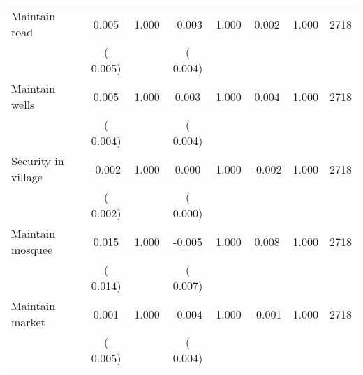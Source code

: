 \begin{tabular}{l*{7}{c}}
 Maintain road       &              0.005       &        1.000  &             -0.003       &        1.000  &              0.002       &              1.000 &  2718 \\ 
                       &       (       0.005)             &                               &       (       0.004)                     &                               &                                               &                                &                      \\ 

 Maintain wells       &              0.005       &        1.000  &              0.003       &        1.000  &              0.004       &              1.000 &  2718 \\ 
                       &       (       0.004)             &                               &       (       0.004)                     &                               &                                               &                                &                      \\ 

 Security in village       &             -0.002       &        1.000  &              0.000       &        1.000  &             -0.002       &              1.000 &  2718 \\ 
                       &       (       0.002)             &                               &       (       0.000)                     &                               &                                               &                                &                      \\ 

 Maintain mosquee       &              0.015       &        1.000  &             -0.005       &        1.000  &              0.008       &              1.000 &  2718 \\ 
                       &       (       0.014)             &                               &       (       0.007)                     &                               &                                               &                                &                      \\ 

 Maintain market       &              0.001       &        1.000  &             -0.004       &        1.000  &             -0.001       &              1.000 &  2718 \\ 
                       &       (       0.005)             &                               &       (       0.004)                     &                               &                                               &                                &                      \\ 

\hline \end{tabular}